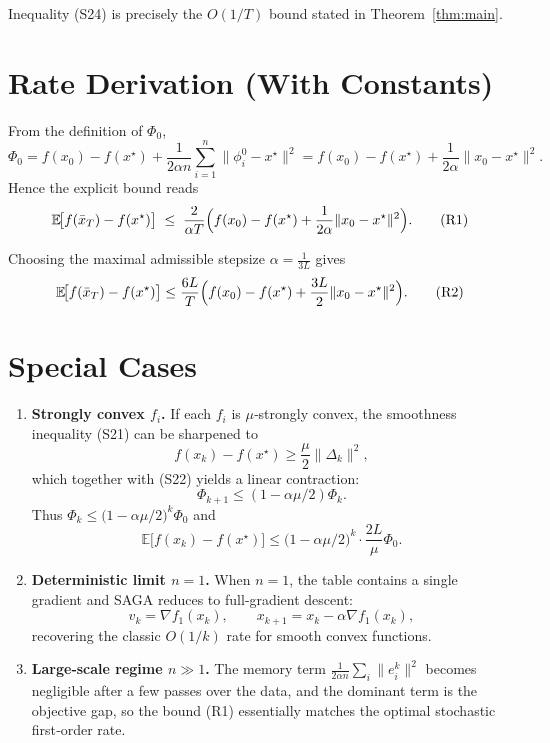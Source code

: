 \documentclass{article}
\newcommand{\E}{\mathbb{E}}
\newcommand{\grad}{\nabla}
\begin{document}
Inequality (S24) is precisely the $O(1/T)$ bound stated in Theorem~\ref{thm:main}. \hfill\qedsymbol

\section*{Rate Derivation (With Constants)}
From the definition of $\Phi_0$,
\[
\Phi_0 = f(x_0)-f(x^\star) + \frac{1}{2\alpha n}\sum_{i=1}^{n}\|\phi_i^0-x^\star\|^2
       = f(x_0)-f(x^\star) + \frac{1}{2\alpha}\|x_0-x^\star\|^2 .
\]
Hence the explicit bound reads
\[
\E\!\bigl[f(\bar x_T)-f(x^\star)\bigr]
\;\le\;
\frac{2}{\alpha T}\Bigl(f(x_0)-f(x^\star) + \frac{1}{2\alpha}\|x_0-x^\star\|^2\Bigr).
\tag{R1}
\]

Choosing the maximal admissible stepsize $\alpha = \frac{1}{3L}$ gives
\[
\E\!\bigl[f(\bar x_T)-f(x^\star)\bigr]
\le
\frac{6L}{T}\Bigl(f(x_0)-f(x^\star) + \frac{3L}{2}\|x_0-x^\star\|^2\Bigr) .
\tag{R2}
\]

\section*{Special Cases}
\begin{enumerate}[label=\alph*)]
\item \textbf{Strongly convex $f_i$.} If each $f_i$ is $\mu$‑strongly convex, the smoothness inequality (S21) can be sharpened to
\[
f(x_k)-f(x^\star)\ge \frac{\mu}{2}\|\Delta_k\|^2 ,
\]
which together with (S22) yields a linear contraction:
\[
\Phi_{k+1}\le\left(1-\alpha\mu/2\right)\Phi_k .
\]
Thus $\Phi_k\le\bigl(1-\alpha\mu/2\bigr)^k\Phi_0$ and
\[
\E\!\bigl[f(x_k)-f(x^\star)\bigr]\le \bigl(1-\alpha\mu/2\bigr)^k\cdot\frac{2L}{\mu}\Phi_0 .
\]

\item \textbf{Deterministic limit $n=1$.} When $n=1$, the table contains a single gradient and SAGA reduces to full‑gradient descent:
\[
v_k = \grad f_1(x_k),\qquad x_{k+1}=x_k-\alpha\grad f_1(x_k),
\]
recovering the classic $O(1/k)$ rate for smooth convex functions.

\item \textbf{Large‑scale regime $n\gg 1$.} The memory term $\frac{1}{2\alpha n}\sum_i\|e_i^k\|^2$ becomes negligible after a few passes over the data, and the dominant term is the objective gap, so the bound (R1) essentially matches the optimal stochastic first‑order rate.

\end{enumerate}
\end{document}
